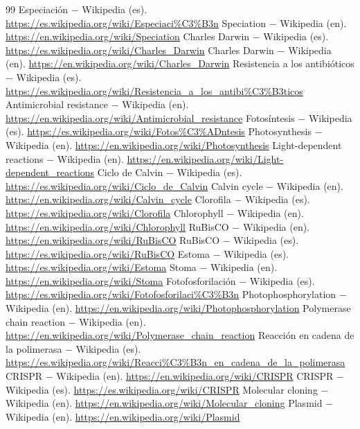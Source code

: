 \documentclass{book}
\begin{document}
\begin{thebibliography}{99}
 Especiación \(-\) Wikipedia (es). \url{https://es.wikipedia.org/wiki/Especiaci%C3%B3n}
 Speciation \(-\) Wikipedia (en). \url{https://en.wikipedia.org/wiki/Speciation}
 Charles Darwin \(-\) Wikipedia (es). \url{https://es.wikipedia.org/wiki/Charles_Darwin}
 Charles Darwin \(-\) Wikipedia (en). \url{https://en.wikipedia.org/wiki/Charles_Darwin}
 Resistencia a los antibióticos \(-\) Wikipedia (es). \url{https://es.wikipedia.org/wiki/Resistencia_a_los_antibi%C3%B3ticos}
 Antimicrobial resistance \(-\) Wikipedia (en). \url{https://en.wikipedia.org/wiki/Antimicrobial_resistance}
 Fotosíntesis \(-\) Wikipedia (es). \url{https://es.wikipedia.org/wiki/Fotos%C3%ADntesis}
 Photosynthesis \(-\) Wikipedia (en). \url{https://en.wikipedia.org/wiki/Photosynthesis}
 Light-dependent reactions \(-\) Wikipedia (en). \url{https://en.wikipedia.org/wiki/Light-dependent_reactions}
 Ciclo de Calvin \(-\) Wikipedia (es). \url{https://es.wikipedia.org/wiki/Ciclo_de_Calvin}
 Calvin cycle \(-\) Wikipedia (en). \url{https://en.wikipedia.org/wiki/Calvin_cycle}
 Clorofila \(-\) Wikipedia (es). \url{https://es.wikipedia.org/wiki/Clorofila}
 Chlorophyll \(-\) Wikipedia (en). \url{https://en.wikipedia.org/wiki/Chlorophyll}
 RuBisCO \(-\) Wikipedia (en). \url{https://en.wikipedia.org/wiki/RuBisCO}
 RuBisCO \(-\) Wikipedia (es). \url{https://es.wikipedia.org/wiki/RuBisCO}
 Estoma \(-\) Wikipedia (es). \url{https://es.wikipedia.org/wiki/Estoma}
 Stoma \(-\) Wikipedia (en). \url{https://en.wikipedia.org/wiki/Stoma}
 Fotofosforilación \(-\) Wikipedia (es). \url{https://es.wikipedia.org/wiki/Fotofosforilaci%C3%B3n}
 Photophosphorylation \(-\) Wikipedia (en). \url{https://en.wikipedia.org/wiki/Photophosphorylation}
 Polymerase chain reaction \(-\) Wikipedia (en). \url{https://en.wikipedia.org/wiki/Polymerase_chain_reaction}
 Reacción en cadena de la polimerasa \(-\) Wikipedia (es). \url{https://es.wikipedia.org/wiki/Reacci%C3%B3n_en_cadena_de_la_polimerasa}
 CRISPR \(-\) Wikipedia (en). \url{https://en.wikipedia.org/wiki/CRISPR}
 CRISPR \(-\) Wikipedia (es). \url{https://es.wikipedia.org/wiki/CRISPR}
 Molecular cloning \(-\) Wikipedia (en). \url{https://en.wikipedia.org/wiki/Molecular_cloning}
 Plasmid \(-\) Wikipedia (en). \url{https://en.wikipedia.org/wiki/Plasmid}

\end{thebibliography}
\end{document}
